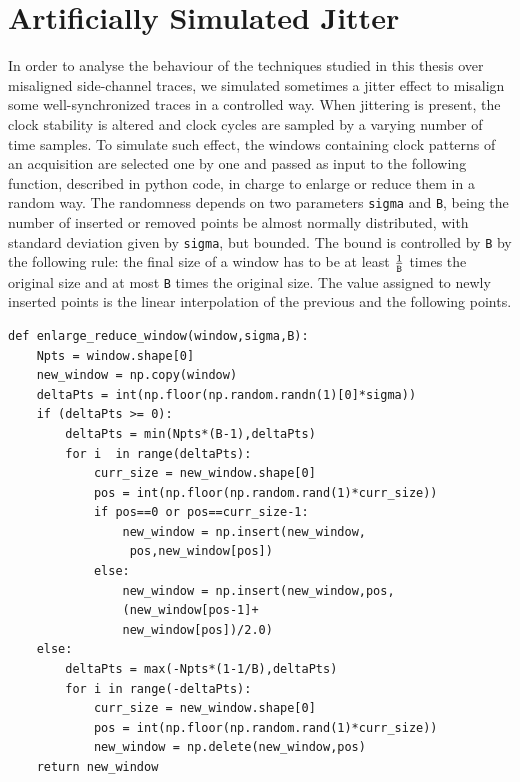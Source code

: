\chapter{Artificially Simulated Jitter}\label{appendix:artificial_jitter}


In order to analyse the behaviour of the techniques studied in this thesis over misaligned side-channel traces, we simulated sometimes a jitter effect to misalign some well-synchronized traces in a controlled way. When jittering is present, the clock stability is altered and clock cycles are sampled by a varying number of time samples. To simulate such effect, the windows containing clock patterns of an acquisition are selected one by one and passed as input to the following function, described in python code, in charge to enlarge or reduce them in a random way. The randomness depends on two parameters \texttt{sigma} and \texttt{B}, being the number of inserted or removed points be almost normally distributed, with standard deviation given by \texttt{sigma}, but bounded. The bound is controlled by \texttt{B} by the following rule: the final size of a window has to be at least $\frac{1}{\text{\texttt{B}}}$ times the original size and at most \texttt{B} times the original size. The value assigned to newly inserted points is the linear interpolation of the previous and the following points.

\begin{lstlisting}[frame=single]
def enlarge_reduce_window(window,sigma,B): 
    Npts = window.shape[0]
    new_window = np.copy(window)
    deltaPts = int(np.floor(np.random.randn(1)[0]*sigma))
    if (deltaPts >= 0):
        deltaPts = min(Npts*(B-1),deltaPts)
        for i  in range(deltaPts):
            curr_size = new_window.shape[0]
            pos = int(np.floor(np.random.rand(1)*curr_size))
            if pos==0 or pos==curr_size-1:
                new_window = np.insert(new_window,
                 pos,new_window[pos])
            else:
                new_window = np.insert(new_window,pos, 
                (new_window[pos-1]+
                new_window[pos])/2.0)
    else:
        deltaPts = max(-Npts*(1-1/B),deltaPts)
        for i in range(-deltaPts):
            curr_size = new_window.shape[0]
            pos = int(np.floor(np.random.rand(1)*curr_size))
            new_window = np.delete(new_window,pos)
    return new_window
    
\end{lstlisting}

